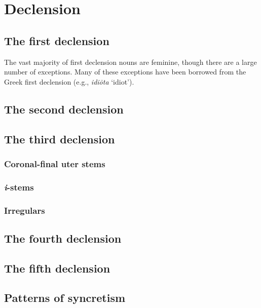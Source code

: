 \chapter{Declension}
\label{declension}

\section{The first declension}

The vast majority of first declension nouns are feminine, though there are a large number of exceptions. Many of these exceptions have been borrowed from the Greek first declension (e.g., \emph{idiōta} `idiot').



\section{The second declension}


\section{The third declension}

\subsection{Coronal-final uter stems}

\subsection{\emph{i}-stems}

\subsection{Irregulars}

\section{The fourth declension}

\section{The fifth declension}

\section{Patterns of syncretism}
